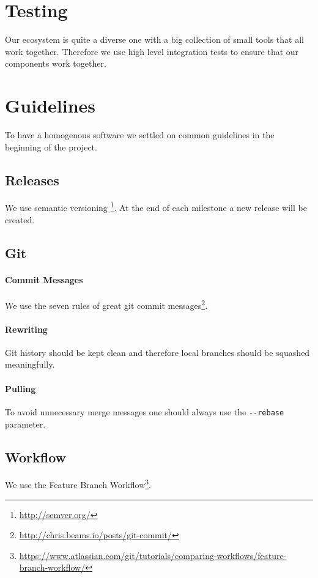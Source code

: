 \section{Testing}\label{testing}

Our ecosystem is quite a diverse one with a big collection of small
tools that all work together. Therefore we use high level integration
tests to ensure that our components work together.

\section{Guidelines}\label{guidelines}
To have a homogenous software we settled on common guidelines in 
the beginning of the project.

\subsection{Releases}
We use semantic versioning \footnote{\url{http://semver.org/}}. At the
end of each milestone a new release will be created.

\subsection{Git}\label{git}
\paragraph{Commit Messages}
We use the seven rules of great git commit
messages\footnote{\url{http://chris.beams.io/posts/git-commit/}}.

\paragraph{Rewriting}
Git history should be kept clean and therefore local branches should be
squashed meaningfully.

\paragraph{Pulling}
To avoid unnecessary merge messages one should always use the
\texttt{-\/-rebase} parameter.

\subsection{Workflow}\label{workflow}
We use the Feature Branch Workflow\footnote{\url{https://www.atlassian.com/git/tutorials/comparing-workflows/feature-branch-workflow/}}.

